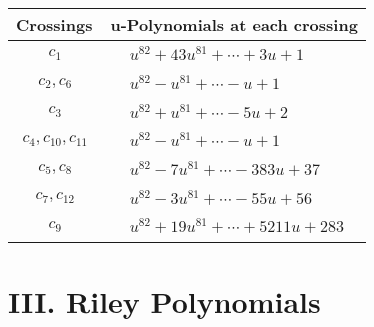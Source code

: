 \documentclass[1p]{elsarticle_modified}
\theoremstyle{definition}
\begin{document}
\begin{tabular}{m{50pt}|m{274pt}}
Crossings & \hspace{64pt}u-Polynomials at each crossing \\
\hline $$\begin{aligned}c_{1}\end{aligned}$$&$\begin{aligned}
&u^{82}+43 u^{81}+\cdots+3 u+1
\end{aligned}$\\
\hline $$\begin{aligned}c_{2},c_{6}\end{aligned}$$&$\begin{aligned}
&u^{82}- u^{81}+\cdots- u+1
\end{aligned}$\\
\hline $$\begin{aligned}c_{3}\end{aligned}$$&$\begin{aligned}
&u^{82}+u^{81}+\cdots-5 u+2
\end{aligned}$\\
\hline $$\begin{aligned}c_{4},c_{10},c_{11}\end{aligned}$$&$\begin{aligned}
&u^{82}- u^{81}+\cdots- u+1
\end{aligned}$\\
\hline $$\begin{aligned}c_{5},c_{8}\end{aligned}$$&$\begin{aligned}
&u^{82}-7 u^{81}+\cdots-383 u+37
\end{aligned}$\\
\hline $$\begin{aligned}c_{7},c_{12}\end{aligned}$$&$\begin{aligned}
&u^{82}-3 u^{81}+\cdots-55 u+56
\end{aligned}$\\
\hline $$\begin{aligned}c_{9}\end{aligned}$$&$\begin{aligned}
&u^{82}+19 u^{81}+\cdots+5211 u+283
\end{aligned}$\\
\hline
\end{tabular}\newpage\renewcommand{\arraystretch}{1}
\centering \section*{ III. Riley Polynomials}
\end{document}
